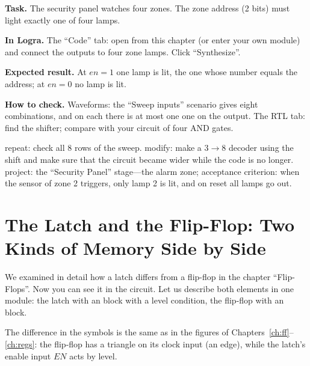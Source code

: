 
\begin{diybox}
\textbf{Task.} The security panel watches four zones. The zone address  (2 bits) must light exactly one of four lamps.

\textbf{In Logra.} The ``Code'' tab: open  from this chapter (or enter your own module) and connect the outputs to four zone lamps. Click ``Synthesize''.

\textbf{Expected result.} At $en=1$ one lamp is lit, the one whose number equals the address; at $en=0$ no lamp is lit.

\textbf{How to check.} Waveforms: the ``Sweep inputs'' scenario gives eight combinations, and on each there is at most one one on the output. The RTL tab: find the \code{<<} shifter; compare with your circuit of four AND gates.

 repeat: check all 8 rows of the sweep.  modify: make a $3\to 8$ decoder using the shift  and make sure that the circuit became wider while the code is no longer.  project: the ``Security Panel'' stage---the alarm zone; acceptance criterion: when the sensor of zone 2 triggers, only lamp 2 is lit, and on reset all lamps go out.
\end{diybox}

\section{The Latch and the Flip-Flop: Two Kinds of Memory Side by Side}

We examined in detail how a latch differs from a flip-flop in the chapter
``Flip-Flops''. Now you can see it in the circuit. Let us describe both elements in one
module: the latch with an  block with a level condition, the flip-flop with
an  block.



The difference in the symbols is the same as in the figures of Chapters~\ref{ch:ff}--\ref{ch:regs}:
the flip-flop has a triangle on its clock input (an edge), while the latch's enable
input $EN$ acts by level.

